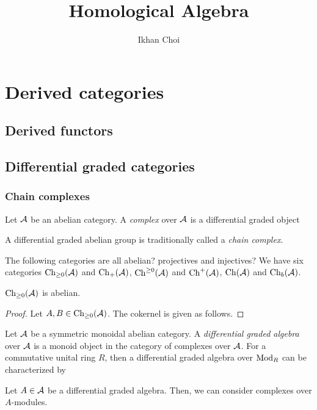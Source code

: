 \documentclass{../../large}
\begin{document}
\title{Homological Algebra}
\author{Ikhan Choi}
\maketitle
\tableofcontents







\part{Derived categories}

\chapter{Derived functors}



\chapter{Differential graded categories}

\section{Chain complexes}



\begin{prb}
Let $\mathcal{A}$ be an abelian category.
A \emph{complex} over $\mathcal{A}$ is a differential graded object


A differential graded abelian group is traditionally called a \emph{chain complex}.

The following categories are all abelian? projectives and injectives?
We have six categories
$\operatorname{Ch}_{\ge0}(\mathcal{A})$ and $\operatorname{Ch}_+(\mathcal{A})$, $\operatorname{Ch}^{\ge0}(\mathcal{A})$ and $\operatorname{Ch}^+(\mathcal{A})$, $\operatorname{Ch}(\mathcal{A})$ and $\operatorname{Ch}_b(\mathcal{A})$.

\begin{parts}
\item $\operatorname{Ch}_{\ge0}(\mathcal{A})$ is abelian.
\end{parts}
\end{prb}

\begin{proof}
Let $A,B\in\operatorname{Ch}_{\ge0}(\mathcal{A})$.
The cokernel is given as follows.
\end{proof}




\begin{prb}
Let $\mathcal{A}$ be a symmetric monoidal abelian category.
A \emph{differential graded algebra} over $\mathcal{A}$ is a monoid object in the category of complexes over $\mathcal{A}$.
For a commutative unital ring $R$, then a differential graded algebra over $\operatorname{Mod}_R$ can be characterized by 

Let $A\in\mathcal{A}$ be a differential graded algebra.
Then, we can consider complexes over $A$-modules.
\end{prb}
\end{document}
